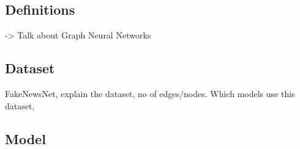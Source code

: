 \subsection{Definitions}
-> Talk about Graph Neural Networks

\subsection{Dataset}
FakeNewsNet, explain the dataset, no of edges/nodes. Which models use this dataset,

\subsection{Model}
